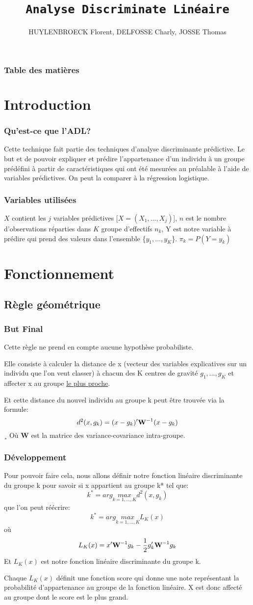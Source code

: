 \documentclass[b]{beamer}
\title{\texttt{Analyse Discriminate Linéaire}}
\author{HUYLENBROECK Florent, DELFOSSE Charly, JOSSE Thomas}
\begin{document}
	\begin{frame}
		\titlepage
	\end{frame}

	\begin{frame}
		\frametitle{Table des matières}
		\tableofcontents
	\end{frame}
	\section{Introduction}
	\begin{frame}
		\frametitle{Qu'est-ce que l'ADL?}
		Cette technique fait partie des techniques d'analyse discriminante prédictive. Le but et de pouvoir expliquer et prédire l'appartenance d'un individu à un groupe prédéfini à partir de caractéristiques qui ont été mesurées au préalable à l'aide de variables prédictives.
		On peut la comparer à la régression logistique. 
	\end{frame}
	\begin{frame}
		\frametitle{Variables utilisées}
			$X$ contient les $j$ variables prédictives [$X = (X_1,...,X_j)$], $n$ est le nombre d'observations réparties dans $K$ groupe d'effectifs $n_k$, Y est notre variable à prédire qui prend des valeurs dans l'ensemble \{$y_1,...,y_K$\}.
			$\pi_k = P(Y = y_k)$
	\end{frame}
	\section{Fonctionnement}
	\subsection{Règle géométrique}
	\begin{frame}
		\frametitle{But Final}
		Cette règle ne prend en compte aucune hypothèse probabiliste. 
		
		Elle consiste à calculer la distance de x (vecteur des variables explicatives sur un individu que l'on veut classer) à chacun des K centres de gravité $g_1,...,g_K$ et affecter x au groupe \underline{le plus proche}.
		
		Et cette distance du nouvel individu au groupe k peut être trouvée via la formule:
		\[
			d^2(x,g_k) = (x - g_k)'\text{\bf W}^{-1}(x - g_k)
		\]¸
		Où {\bf W} est la matrice des variance-covariance intra-groupe.
	\end{frame}
	\begin{frame}
	\frametitle{Développement}
		Pour pouvoir faire cela, nous allons définir notre fonction linéaire discriminante du groupe k pour savoir si x appartient au groupe k* tel que:
		\[
			k^* = arg \underset{k = 1,...,K}{max} d^2(x,g_k)
		\]
		 que l'on peut réécrire:
		\[
		k^* = arg \underset{k = 1,...,K}{max} L_K(x)
		\]
		où 
		\[
		L_K(x) = x'\text{\bf W}^{-1}g_k - \frac{1}{2}g'_k\text{\bf W}^{-1}g_k
		\]
		Et $L_K(x)$ est notre fonction linéaire discriminante du groupe k.
		
		Chaque $L_K(x)$ définit une fonction score qui donne une note représentant la probabilité d'appartenance au groupe de la fonction linéaire. X est donc affecté au groupe dont le score est le plus grand.
	\end{frame}
\end{document}
